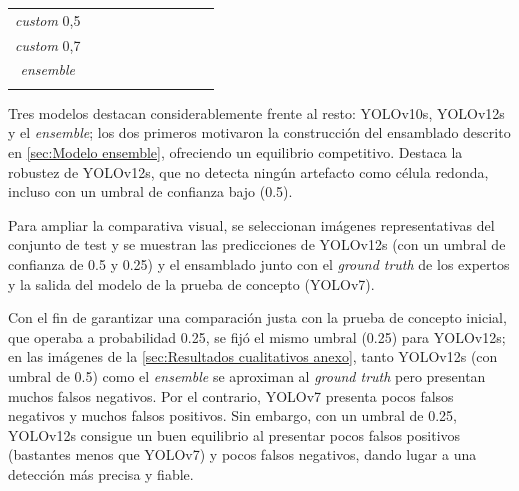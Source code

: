 \documentclass[12pt,a4paper,onecolumn,oneside]{report}
\begin{document}
\begin{table}[ht]
{\begin{tabular}{!{\vrule width 1.2pt}c|c|c|c|c|c|c|c|c|c!{\vrule width 1.2pt}}
\hline
\textit{custom} 0,5        &  &  &  &  &  &  &  &  &  \\
\hline
\textit{custom} 0,7        &  &  &  &  &  &  &  &  &  \\
\hline
\textit{ensemble}       &  &  &  &  &  &  &  &  &  \\
\hline
\end{tabular}
}
\label{tab:resultados_artefactos}
\end{table}

Tres modelos destacan considerablemente frente al resto: YOLOv10s, YOLOv12s y el \textit{ensemble}; los dos primeros motivaron la construcción del ensamblado descrito en 
\autoref{sec:Modelo ensemble}, ofreciendo un equilibrio competitivo. Destaca la robustez de YOLOv12s, que no detecta ningún artefacto como célula redonda, incluso con un umbral de confianza bajo (0.5).

Para ampliar la comparativa visual, se seleccionan imágenes representativas del conjunto de test y se muestran las predicciones de YOLOv12s (con un umbral de confianza de 0.5 y 0.25) y el ensamblado junto con el
\textit{ground truth} de los expertos y la salida del modelo de la prueba de concepto (YOLOv7). 

Con el fin de garantizar una comparación justa con la prueba de concepto inicial, que operaba a probabilidad 0.25, se fijó el mismo umbral (0.25) para YOLOv12s; 
en las imágenes de la \autoref{sec:Resultados cualitativos anexo}, tanto YOLOv12s (con umbral de 0.5) como el \textit{ensemble} se aproximan al \textit{ground truth} pero presentan muchos falsos negativos. Por el contrario, YOLOv7 presenta pocos falsos negativos y muchos falsos positivos.
Sin embargo, con un umbral de 0.25, YOLOv12s consigue un buen equilibrio al presentar pocos falsos positivos (bastantes menos que YOLOv7) y pocos falsos negativos, dando lugar a una detección más precisa y fiable.
\end{document}
